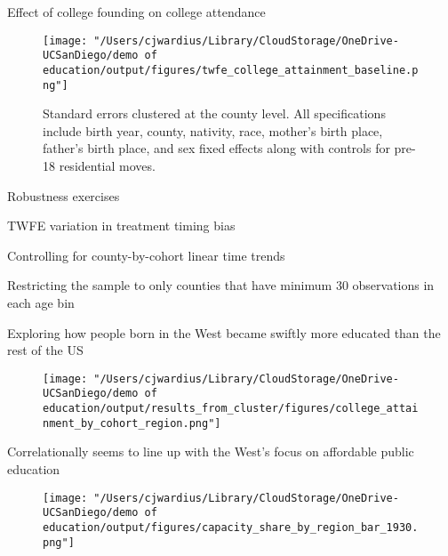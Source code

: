 \documentclass[notes,11pt, aspectratio=169]{beamer}
\newenvironment{wideitemize}{\itemize\addtolength{\itemsep}{10pt}}{\enditemize}
\begin{document}
\begin{frame}[label=baseline]{Effect of college founding on college attendance}
  \begin{figure}
        \centering
        \texttt{[image: "/Users/cjwardius/Library/CloudStorage/OneDrive-UCSanDiego/demo of education/output/figures/twfe\_college\_attainment\_baseline.png"]}
        \caption{Standard errors clustered at the county level. All specifications include birth year, county, nativity, race, mother's birth place, father's birth place, and sex fixed effects along with controls for pre-18 residential moves.}
    \end{figure}
\end{frame}



\begin{frame}[label=robustness]{Robustness exercises}
  \begin{wideitemize}
    \item TWFE variation in treatment timing bias \hyperlink{borusyak}{}
    \item Controlling for county-by-cohort linear time trends \hyperlink{county_trends}{}
    \item Restricting the sample to only counties that have minimum 30 observations in each age bin \hyperlink{min30}{}
  \end{wideitemize}
\end{frame}

\begin{frame}{Exploring how people born in the West became swiftly more educated than the rest of the US}
  \begin{figure}
        \centering
        \texttt{[image: "/Users/cjwardius/Library/CloudStorage/OneDrive-UCSanDiego/demo of education/output/results\_from\_cluster/figures/college\_attainment\_by\_cohort\_region.png"]}
    \end{figure}
\end{frame}

\begin{frame}{Correlationally seems to line up with the West's focus on affordable public education}
  \begin{figure}
        \centering
        \texttt{[image: "/Users/cjwardius/Library/CloudStorage/OneDrive-UCSanDiego/demo of education/output/figures/capacity\_share\_by\_region\_bar\_1930.png"]}
    \end{figure}
\end{frame}
\end{document}
